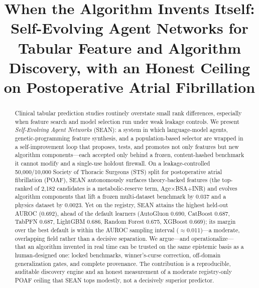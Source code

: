 \documentclass[10pt,conference]{IEEEtran}
\newcommand{\confirm}[1]{\textcolor{red}{[TO CONFIRM: #1]}}
\newcommand{\sean}{SEAN}
\begin{document}
\title{When the Algorithm Invents Itself: Self-Evolving Agent Networks for Tabular
Feature and Algorithm Discovery, with an Honest Ceiling on Postoperative Atrial
Fibrillation}

\author{
\IEEEauthorblockA{NeverHuman Search\\Scottsdale, AZ, USA\\\confirm{email}}
\and
{}
}

\maketitle

\begin{abstract}
Clinical tabular prediction studies routinely overstate small rank differences, especially
when feature search and model selection run under weak leakage controls. We present
\emph{Self-Evolving Agent Networks} (\sean{}): a system in which language-model agents,
genetic-programming feature synthesis, and a population-based selector are wrapped in a
self-improvement loop that proposes, tests, and promotes not only features but new algorithm
components---each accepted only behind a frozen, content-hashed benchmark it cannot modify
and a single-use holdout firewall. On a leakage-controlled 50{,}000/10{,}000 Society of
Thoracic Surgeons (STS) split for postoperative atrial fibrillation (POAF), \sean{}
autonomously surfaces theory-backed features (the top-ranked of 2{,}182 candidates is a
metabolic-reserve term, Age$\times$BSA$+$INR) and evolves algorithm components that lift a
frozen multi-dataset benchmark by 0.037 and a physics dataset by 0.0023. Yet on the
registry, \sean{} attains the highest held-out AUROC (0.692), ahead of the default learners
(AutoGluon 0.690, CatBoost 0.687, TabPFN 0.687, LightGBM 0.686, Random Forest 0.675, XGBoost
0.669); its margin over the best default is within the AUROC sampling interval ($\approx$0.011)---a moderate, overlapping
field rather than a decisive separation. We argue---and operationalize---that an algorithm invented in real
time can be trusted on the same epistemic basis as a human-designed one: locked benchmarks,
winner's-curse correction, off-domain generalization gates, and complete provenance. The
contribution is a reproducible, auditable discovery engine and an honest measurement of a
moderate registry-only POAF ceiling that \sean{} tops modestly, not a decisively superior predictor.
\end{abstract}
\end{document}
